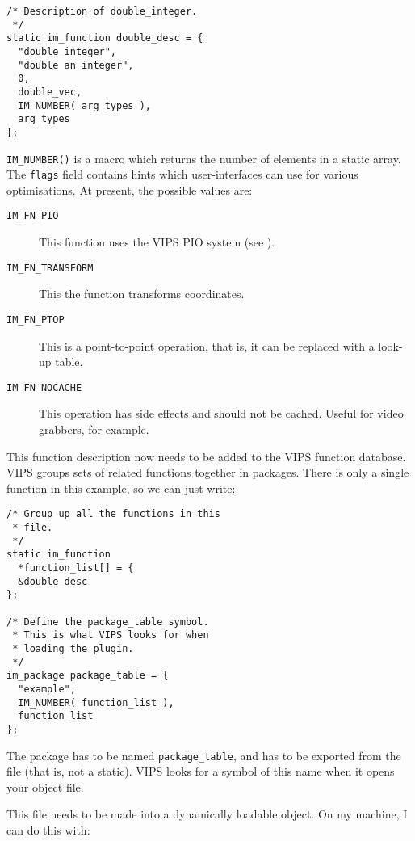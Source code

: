 \begin{verbatim}
/* Description of double_integer.
 */ 
static im_function double_desc = {
  "double_integer",
  "double an integer",
  0,                 
  double_vec,       
  IM_NUMBER( arg_types ),
  arg_types        
};
\end{verbatim}
\label{sec:number}

\verb+IM_NUMBER()+ is a macro which returns the number of elements in a
static array. The \verb+flags+ field contains hints which user-interfaces
can use for various optimisations. At present, the possible values are:

\begin{description}

\item[\texttt{IM\_FN\_PIO}]
This function uses the VIPS PIO system (see ).

\item[\texttt{IM\_FN\_TRANSFORM}]
This the function transforms coordinates.  

\item[\texttt{IM\_FN\_PTOP}]
This is a point-to-point operation, that is, it can be replaced with a
look-up table.

\item[\texttt{IM\_FN\_NOCACHE}]
This operation has side effects and should not be cached. Useful for video
grabbers, for example.

\end{description}

This function description now needs to be added to the VIPS function database.
VIPS groups sets of related functions together in packages. There is only
a single function in this example, so we can just write:

\begin{verbatim}
/* Group up all the functions in this 
 * file.
 */
static im_function 
  *function_list[] = {
  &double_desc
};

/* Define the package_table symbol. 
 * This is what VIPS looks for when 
 * loading the plugin.
 */
im_package package_table = {
  "example",        
  IM_NUMBER( function_list ),
  function_list    
};
\end{verbatim}

The package has to be named \verb+package_table+, and has to be exported
from the file (that is, not a static). VIPS looks for a symbol of this name
when it opens your object file.

This file needs to be made into a dynamically loadable object. On my machine,
I can do this with:

